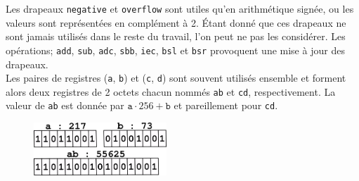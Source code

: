 \documentclass{article}
\begin{document}
Les drapeaux \texttt{negative} et \texttt{overflow} sont utiles qu'en arithmétique signée, ou les valeurs sont représentées en complément à 2. Étant donné que ces drapeaux ne sont jamais utilisés dans le reste du travail, l'on peut ne pas les considérer.
Les opérations; \texttt{add}, \texttt{sub}, \texttt{adc}, \texttt{sbb}, \texttt{iec}, \texttt{bsl} et \texttt{bsr} provoquent une mise à jour des drapeaux.\\
Les paires de registres (\texttt{a}, \texttt{b}) et (\texttt{c}, \texttt{d}) sont souvent utilisés ensemble et forment alors deux registres de 2 octets chacun nommés \texttt{ab} et \texttt{cd}, respectivement. La valeur de \texttt{ab} est donnée par $\texttt{a}\cdot 256 + \texttt{b}$ et pareillement pour \texttt{cd}.
\begin{figure}[htp]
    \centering
    \includegraphics[width=5cm]{images/register_composition.png}
    \label{fig:register_composition}
\end{figure}

\pagebreak
\end{document}
